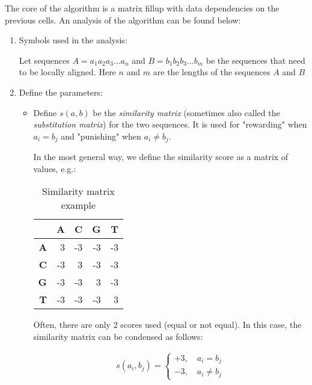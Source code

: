 The core of the algorithm is a matrix fillup with data dependencies on the previous cells. An analysis of the algorithm can be found below:

\begin{enumerate}
	\item Symbols used in the analysis:
	
	Let sequences $A = a_1 a_2 a_3 \dots a_n$ and $B = b_1 b_2 b_3 \dots b_m$ be the sequences that need to be locally aligned. Here $n$ and $m$ are the lengths of the sequences $A$ and $B$
	
	\item Define the parameters: 
	
	\begin{itemize}
		\item Define $s(a,b)$ be the \emph{similarity matrix} (sometimes also called the \emph{substitution matrix}) for the two sequences. It is used for "rewarding" when $a_i = b_j$ and "punishing" when $a_i \neq b_j$.
		
		In the most general way, we define the similarity score as a matrix of values, e.g.:
		
		\begin{table}[H]
			\centering
			\begin{tabular}{|r|r|r|r|r|}
				\hline
				& \textbf{A} & \textbf{C} & \textbf{G} & \textbf{T} \\ \hline
				\textbf{A} & 3          & -3         & -3         & -3         \\ \hline
				\textbf{C} & -3         & 3          & -3         & -3         \\ \hline
				\textbf{G} & -3         & -3         & 3          & -3         \\ \hline
				\textbf{T} & -3         & -3         & -3         & 3          \\ \hline
			\end{tabular}
			
			\caption{\centering Similarity matrix example}
		\end{table}
		
		Often, there are only 2 scores used (equal or not equal). In this case, the similarity matrix can be condensed as follows:
		
		\begin{align*}
		s(a_i,b_j)=
		\begin{cases}
		+3, \quad a_i=b_j     \\
		-3, \quad a_i\neq b_j
		\end{cases}
		\end{align*}
		

\end{itemize}
\end{enumerate}
